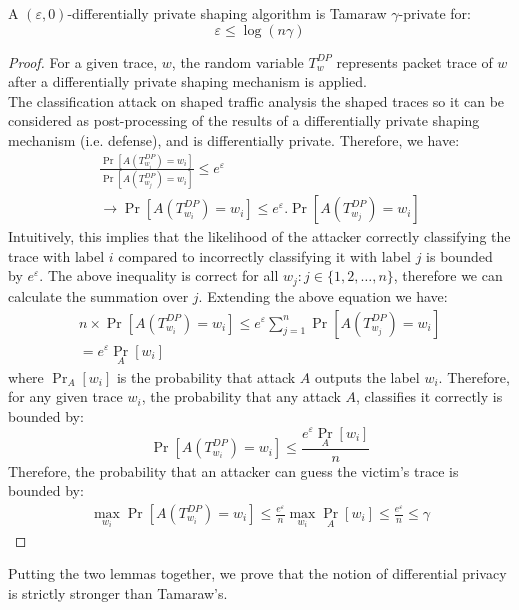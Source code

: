 \begin{lemma-numbered}
  A $(\varepsilon, 0)$-differentially private shaping algorithm is Tamaraw $\gamma$-private for:
  \begin{equation*}
    \varepsilon \leq \log(n\gamma)
  \end{equation*}
\end{lemma-numbered}
\begin{proof}
  For a given trace, $w$, the random variable $T_{w}^{DP}$ represents packet
  trace of $w$ after  a differentially private shaping mechanism is applied.
  \\
  The classification attack on shaped traffic analysis the shaped traces so it can be considered as post-processing of the results of a
  differentially private shaping mechanism (i.e. defense), and is differentially
  private. Therefore,
  we have:
  \begin{align*}
    \frac{\Pr[A(T_{w_{i}}^{DP}) = w_i]}{\Pr[A(T_{w_{j}}^{DP}) = w_i]} \leq e^
    {\varepsilon}
    \\
    \rightarrow \Pr[A(T_{w_{i}}^{DP}) = w_i] \leq e^
    {\varepsilon} .\Pr[A(T_{w_{j}}^{DP}) = w_i]
  \end{align*}
  Intuitively, this implies that the likelihood of the attacker correctly classifying the trace with label $i$ compared to incorrectly classifying it with label $j$ is bounded by $e^{\varepsilon}$.
  The above inequality is correct for all $w_j: j\in \{1, 2, \dots, n\}$, therefore we can calculate the summation over $j$.
  Extending the above equation we have:
  \begin{align*}
    n\times \Pr[A(T_{w_{i}}^{DP}) = w_i] \leq e^{\varepsilon}\sum_{j=1}^{n} \Pr[A(T_{w_{j}}^{DP}) = w_i] \\
    = e^{\varepsilon} \operatorname{Pr}_{A}[w_i]
  \end{align*}
  where $\Pr_{A}[w_i]$ is the probability that attack $A$ outputs the label
  $w_i$.
  Therefore, for any given trace $w_i$, the probability that any attack $A$, classifies it correctly is bounded by:
  \begin{equation*}
    \Pr[A(T_{w_{i}}^{DP}) = w_i] \leq \frac{e^{\varepsilon} \Pr_{A}[w_i]}{n}
  \end{equation*}
  Therefore, the probability that an attacker can guess the victim’s trace is bounded by:
  \begin{align*}
    \max_{w_i}{\Pr[A(T_{w_{i}}^{DP}) = w_i]} \leq \frac{e^{\varepsilon}}{n} \max_{w_i}{\operatorname{Pr}_{A}[w_i]} \leq \frac{e^{\varepsilon}}{n} \leq \gamma
  \end{align*}
\end{proof}
\noindent
Putting the two lemmas together, we prove that the notion of differential
privacy is strictly stronger than Tamaraw's.
